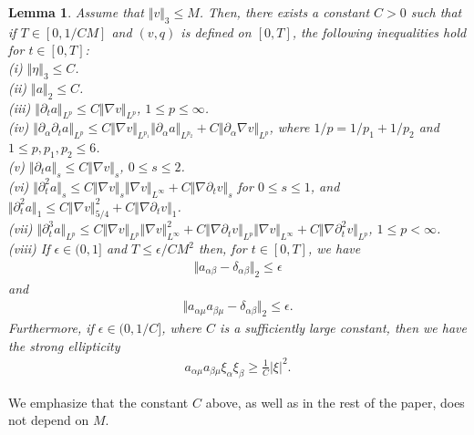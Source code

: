 \documentclass[10pt,reqno]{amsart}
\theoremstyle{plain}
\newtheorem{lemma}[theorem]{Lemma}
\theoremstyle{definition}
\numberwithin{equation}{section}
\newcommand{\al}{\alpha}
\newcommand{\be}{\beta}
\newcommand{\de}{\delta}
\newcommand{\norm}[1]{\Vert#1\Vert}
\newcommand{\abs}[1]{\vert#1\vert}
\def\fractext#1#2{{#1}/{#2}}
\begin{document}
\begin{lemma}
\label{lemma_auxiliary_long}
Assume that $\norm{v}_{3} \leq M$. Then, there exists a constant $C> 0$
such that if $T \in [0,\fractext{1}{C M}]$ and $(v,q)$ is defined on $[0,T]$, 
the following inequalities hold for 
$t \in [0,T]$:\\
\noindent(i) $\norm{\eta}_3 \leq C$.\\
\noindent(ii) $\norm{ a}_2 \leq C$.\\
\noindent(iii) $\norm{ \partial_t a }_{L^p} \leq C \norm{ \nabla v}_{L^p}$, $1 \leq p \leq \infty$.\\
\noindent(iv) $\norm{ \partial_\al \partial_t a }_{L^p} \leq C \norm{\nabla v}_{L^{p_1}}
\norm{\partial_\al a}_{L^{p_2}}  + 
C\norm{\partial_\al \nabla v}_{L^p}$, 
where $\fractext{1}{p} = \fractext{1}{p_1} + \fractext{1}{p_2}$
and $1 \leq p, p_1, p_2 \leq 6$.\\
\noindent(v) $\norm{\partial_t a }_s \leq C \norm{ \nabla v}_s$, $0 \leq s \leq 2$.\\
(vi) $\norm{\partial^2_t a}_s \leq C \norm{\nabla v}_s \norm{\nabla v}_{L^\infty}
+ C \norm{\nabla \partial_t v }_s$ for $0 \leq s \leq 1$, and
$\norm{ \partial^2_t a }_1 \leq C \norm{ \nabla v}^2_{\fractext{5}{4}} + C 
\norm{ \nabla \partial_t v }_1$.\\
\noindent(vii) $\norm{\partial^3_t a}_{L^p} \leq C \norm{\nabla v}_{L^p} \norm{\nabla v}_{L^\infty}^2
+ C \norm{\nabla \partial_t v}_{L^p} \norm{\nabla v}_{L^\infty}
+ C \norm{\nabla \partial^2_t v}_{L^p}$, $1 \leq p < \infty$.\\
\noindent(viii) If $\epsilon\in(0,1]$ 
and $T \leq \fractext{\epsilon}{CM^2}$ then, for 
$t \in [0,T]$, we have
\begin{gather}
\norm{a_{\al \be} - \de_{\al\be} }_2 \leq \epsilon
\nonumber
\end{gather}
and
\begin{gather}
\norm{a_{\al \mu} a_{\be\mu} - \de_{\al\be} }_2 \leq \epsilon.
\nonumber
\end{gather}
Furthermore, if $\epsilon\in(0,1/C]$, 
where $C$ is a sufficiently large constant,
then 
we have the strong ellipticity
\begin{gather}
a_{\al \mu} a_{\be\mu} \xi_\al \xi_\be \geq \frac{1}{C} \abs{\xi}^2.
\nonumber
\end{gather}
\end{lemma}

We emphasize that the constant $C$ above, as well as in the rest of
the paper, does not depend on $M$.
\end{document}
